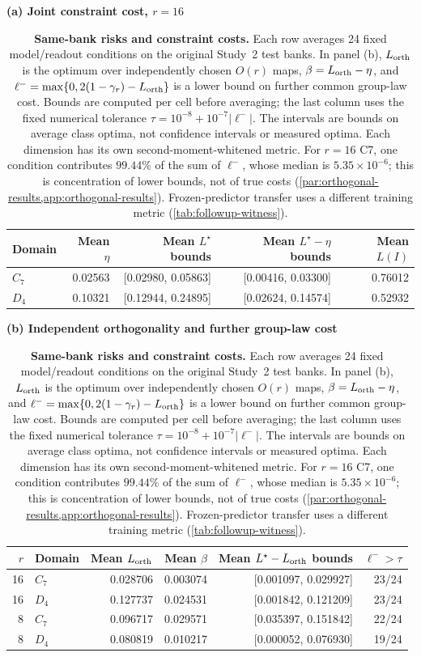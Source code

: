 \begin{table}[t]
\centering\small
\setlength{\tabcolsep}{4pt}
\textbf{(a) Joint constraint cost, $r=16$}\par\smallskip
\begin{tabular}{@{}lrrrr@{}}
\toprule
Domain & Mean $\eta$ & Mean $L^\star$ bounds & Mean $L^\star-\eta$ bounds & Mean $L(I)$ \\
\midrule
$C_7$ & 0.02563 & [0.02980, 0.05863] & [0.00416, 0.03300] & 0.76012 \\
$D_4$ & 0.10321 & [0.12944, 0.24895] & [0.02624, 0.14574] & 0.52932 \\
\bottomrule
\end{tabular}
\par\medskip
\textbf{(b) Independent orthogonality and further group-law cost}\par\smallskip
\begin{tabular}{@{}rlrrrr@{}}
\toprule
$r$ & Domain & Mean $L_{\rm orth}$ & Mean $\beta$ & Mean $L^\star-L_{\rm orth}$ bounds & $\ell^->\tau$ \\
\midrule
16 & $C_7$ & 0.028706 & 0.003074 & [0.001097, 0.029927] & 23/24 \\
16 & $D_4$ & 0.127737 & 0.024531 & [0.001842, 0.121209] & 23/24 \\
8 & $C_7$ & 0.096717 & 0.029571 & [0.035397, 0.151842] & 22/24 \\
8 & $D_4$ & 0.080819 & 0.010217 & [0.000052, 0.076930] & 19/24 \\
\bottomrule
\end{tabular}
\caption{\textbf{Same-bank risks and constraint costs.} Each row averages 24 fixed model/readout conditions on the original Study~2 test banks. In panel (b), $L_{\rm orth}$ is the optimum over independently chosen $O(r)$ maps, $\beta=L_{\rm orth}-\eta$, and $\ell^-=\max\{0,2(1-\gamma_r)-L_{\rm orth}\}$ is a lower bound on further common group-law cost. Bounds are computed per cell before averaging; the last column uses the fixed numerical tolerance $\tau=10^{-8}+10^{-7}|\ell^-|$. The intervals are bounds on average class optima, not confidence intervals or measured optima. Each dimension has its own second-moment-whitened metric. For $r=16$ C7, one condition contributes $99.44\%$ of the sum of $\ell^-$, whose median is $5.35\times10^{-6}$; this is concentration of lower bounds, not of true costs (\cref{par:orthogonal-results,app:orthogonal-results}). Frozen-predictor transfer uses a different training metric (\cref{tab:followup-witness}).}
\label{tab:core-risk-summary}
\end{table}
